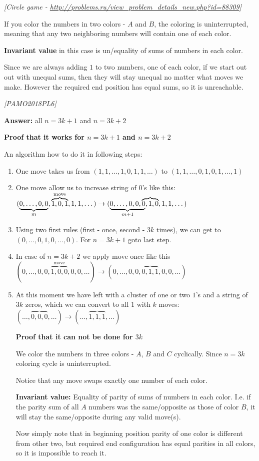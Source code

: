 \begin{problem}
\textit{[Circle game - \url{http://problems.ru/view_problem_details_new.php?id=88309}]}

If you color the numbers in two colors - $A$ and $B$, the coloring is uninterrupted, meaning that any two neighboring numbers will contain one of each color.

\textbf{Invariant value} in this case is un/equality of sums of numbers in each color. 

Since we are always adding $1$ to two numbers, one of each color, if we start out out with unequal sums, then they will stay unequal no matter what moves we make. However the required end position has equal sums, so it is unreachable.
\end{problem}
%




\begin{problem}
\textit{[PAMO2018PL6]}

\textbf{Answer:} all $n=3k+1$ and $n=3k+2$

\textbf{Proof that it works for $n=3k+1$ and $n=3k+2$}

An algorithm how to do it in following steps:
\begin{enumerate}
\item One move takes us from $(1,1,\dots,1,0,1,1,\dots)$ to $(1,1,\dots,0,1,0,1,\dots,1)$  
\item One move allow us to increase string of $0$'s like this: $(\underbrace{0,\dots,0,0}_m,\overbrace{1,0,1}^\text{move},1,1,\dots)  \rightarrow 
(\lefteqn{\underbrace{\phantom{0,\dots,0,0,0}}_{m+1}}0,\dots,0,0,\overbrace{0,1,0},1,1,\dots) $  
\item Using two first rules (first - once, second - $3k$ times), we can get to $(0,\dots,0,1,0,\dots,0)$. For $n=3k+1$ goto last step.
\item In case of $n=3k+2$ we apply move once like this $(0,\dots,0,0,\overbrace{1,0,0}^\text{move},0,0,\dots)  \rightarrow (0,\dots,0,0,\overbrace{0,1,1},0,0,\dots)$
\item At this moment we have left with a cluster of one or two $1$'s and a string of $3k$ zeros, which we can convert to all $1$ with $k$ moves: $(\dots,\overbrace{0,0,0},\dots) \rightarrow (\dots,\overbrace{1,1,1},\dots)$ 

\textbf{Proof that it can not be done for $3k$}

We color the numbers in three colors - $A$, $B$ and $C$ cyclically. Since $n=3k$ coloring cycle is uninterrupted.

Notice that any move swaps exactly one number of each color. 

\textbf{Invariant value:} Equality of parity of sums of numbers in each color. I.e. if the parity sum of all $A$ numbers was the same/opposite as those of color $B$, it will stay the same/opposite during any valid move(s). 

Now simply note that in beginning position parity of one color is different from other two, but required end configuration has equal parities in all colors, so it is impossible to reach it.
 
\end{enumerate}
\end{problem}
%

